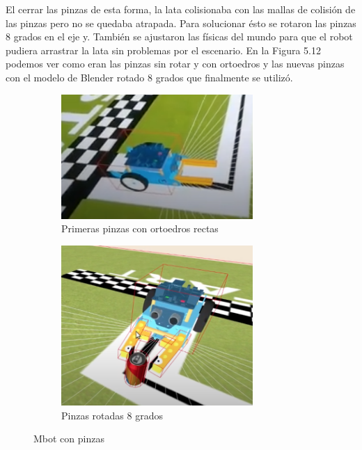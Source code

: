 El cerrar las pinzas de esta forma,  la lata colisionaba con las mallas de colisión de las pinzas pero no se quedaba atrapada. Para solucionar ésto se rotaron las pinzas 8 grados en el eje y. También se ajustaron las físicas del mundo para que el robot pudiera arrastrar la lata sin problemas por el escenario. En la Figura 5.12 podemos ver como eran las pinzas sin rotar y con ortoedros y las nuevas pinzas con el modelo de Blender rotado 8 grados que finalmente se utilizó.


\begin{figure}[H]
  \begin{subfigure}[b]{0.5\textwidth}
  \centering
    \includegraphics[width=0.8\textwidth, height=0.5\textwidth]{chapters/images/pinzarecta.png}
    \caption{Primeras pinzas  con ortoedros rectas}
    \label{fig:f1}
  \end{subfigure}
  \hfill
  \begin{subfigure}[b]{0.5\textwidth}
  \centering
    \includegraphics[width=0.8\textwidth, height=0.5\textwidth]{chapters/images/pinzaok.png}
	\caption{Pinzas rotadas 8 grados}    
    \label{fig:f2}
 
  \end{subfigure}
  \caption{Mbot con pinzas}
\end{figure}

